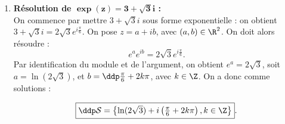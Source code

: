 \begin{correction}
\begin{enumerate}
\item \textbf{R\'esolution de $\mathbf{\exp(z)=3+\sqrt{3}i}$ :}\\
On commence par mettre $3+\sqrt{3}i$ sous forme exponentielle : on obtient $3+\sqrt{3}i=2\sqrt{3} e^{i \frac{\pi}{6}}$. On pose $z=a+ib$, avec $(a,b)\in \R^2$. On doit alors r\'esoudre :
$$e^a e^{ib} = 2\sqrt{3} e^{i \frac{\pi}{6}}.$$
Par identification du module et de l'argument, on obtient $e^a=2\sqrt{3}$, soit $a = \ln(2\sqrt{3})$, et $b=\ddp \frac{\pi}{6} + 2k \pi$, avec $k \in \Z$. On a donc comme solutions : 

$$\fbox{$\ddp \mathcal{S} = \left\{ \ln(2\sqrt{3}) + i \left(\frac{\pi}{6} + 2k \pi\right),k \in \Z\right\}$}.$$
\end{enumerate}
\end{correction}